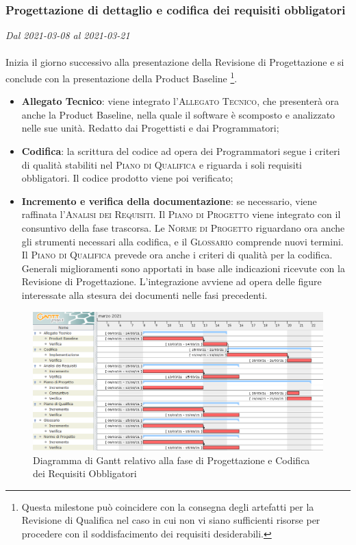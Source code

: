 \subsubsection{Progettazione di dettaglio e codifica dei requisiti obbligatori}

\textit{Dal 2021-03-08 al 2021-03-21}
\\\\
Inizia il giorno successivo alla presentazione della Revisione di Progettazione e si conclude con la presentazione della Product Baseline \footnote{Questa milestone può coincidere con la consegna degli artefatti per la Revisione di Qualifica nel caso in cui non vi siano sufficienti risorse per procedere con il soddisfacimento dei requisiti desiderabili.}.
\begin{itemize}
	\item \textbf{Allegato Tecnico}: viene integrato l'\textsc{Allegato Tecnico}, che presenterà ora anche la Product Baseline, nella quale il software è scomposto e analizzato nelle sue unità. Redatto dai Progettisti e dai Programmatori;
	\item \textbf{Codifica}: la scrittura del codice ad opera dei Programmatori segue i criteri di qualità stabiliti nel \textsc{Piano di Qualifica} e riguarda i soli requisiti obbligatori. Il codice prodotto viene poi verificato;
	\item \textbf{Incremento e verifica della documentazione}: se necessario, viene raffinata l'\textsc{Analisi dei Requisiti}. Il \textsc{Piano di Progetto} viene integrato con il consuntivo della fase trascorsa.  Le \textsc{Norme di Progetto} riguardano ora anche gli strumenti necessari alla codifica, e il \textsc{Glossario} comprende nuovi termini. Il \textsc{Piano di Qualifica} prevede ora anche i criteri di qualità per la codifica. Generali miglioramenti sono apportati in base alle indicazioni ricevute con la Revisione di Progettazione. L'integrazione avviene ad opera delle figure interessate alla stesura dei documenti nelle fasi precedenti.
	
\end{itemize}


\begin{figure}[H]
	\centering
	\includegraphics[scale=0.52]{res/images/04_gantt_codifica_obbligatori.png}
	\caption{Diagramma di Gantt relativo alla fase di Progettazione  e Codifica dei Requisiti Obbligatori}
\end{figure}



